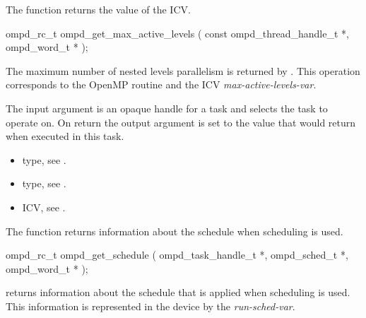 \label{subsubsubsec:ompd_get_max_active_levels}
\summary
The  function returns the value of the  ICV.

\format
\begin{cspecific}
\begin{ompSyntax}
ompd_rc_t ompd_get_max_active_levels (
  const ompd_thread_handle_t *,
  ompd_word_t *
);
\end{ompSyntax}
\end{cspecific}

\descr
The maximum number of nested levels parallelism is returned by
.
This operation corresponds to the OpenMP routine
and the ICV \emph{max-active-levels-var}.%

\argdesc
The input argument  is an opaque handle for a task and selects the task to operate on.
On return the output argument  is set to the value that  would return when
executed in this task.

\crossreferences
\begin{itemize}
	\item {} type, see .
	\item {} type, see .
	\item {} ICV, see .
\end{itemize}

\label{subsubsubsec:ompd_get_schedule}
\summary
The  function returns information about the schedule when  scheduling is used.

\format
\begin{cspecific}
\begin{ompSyntax}
ompd_rc_t ompd_get_schedule (
  ompd_task_handle_t *,
  ompd_sched_t *,
  ompd_word_t *
);
\end{ompSyntax}
\end{cspecific}

\descr

 returns information about the schedule that is
applied when  scheduling is used.
%
This information is represented in the device by the
\emph{run-sched-var}.

